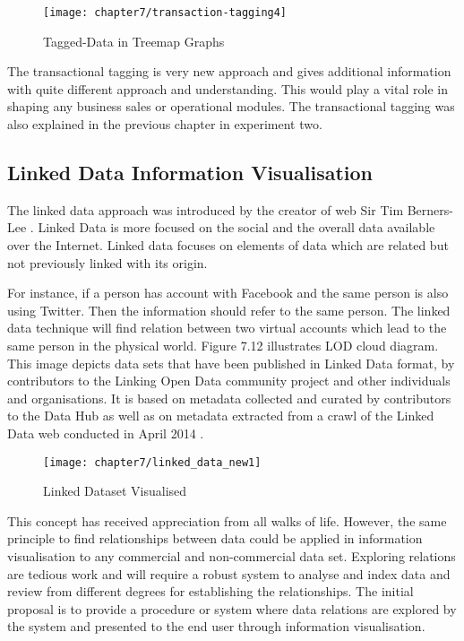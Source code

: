 \begin{figure}[H]
\centering
\texttt{[image: chapter7/transaction-tagging4]}
\caption{ Tagged-Data in Treemap Graphs}
\end{figure}

The transactional tagging is very new approach and gives additional information with quite different approach and understanding. This would play a vital role in shaping any business sales or operational modules. The transactional tagging was also explained in the previous chapter in experiment two. 

\subsection{Linked Data Information Visualisation}

The linked data approach was introduced by the creator of web Sir Tim Berners-Lee \cite{bizer2009linked}. Linked Data is more focused on the social and the overall data available over the Internet. Linked data focuses on elements of data which are related but not previously linked with its origin.

For instance, if a person has account with Facebook and the same person is also using Twitter. Then the information should refer to the same person. The linked data technique will find relation between two virtual accounts which lead to the same person in the physical world. Figure 7.12 illustrates LOD cloud diagram. This image depicts data sets that have been published in Linked Data format, by contributors to the Linking Open Data community project and other individuals and organisations. It is based on metadata collected and curated by contributors to the Data Hub as well as on metadata extracted from a crawl of the Linked Data web conducted in April 2014 \cite{linkeddata1}.

\begin{figure}[H]
\centering
\texttt{[image: chapter7/linked\_data\_new1]}
\caption{Linked Dataset Visualised \cite{linkeddata1}}
\end{figure}

This concept has received appreciation from all walks of life. However, the same principle to find relationships between data could be applied in information visualisation to any commercial and non-commercial data set. Exploring relations are tedious work and will require a robust system to analyse and index data and review from different degrees for establishing the relationships. The initial proposal is to provide a procedure or system where data relations are explored by the system and presented to the end user through information visualisation.

